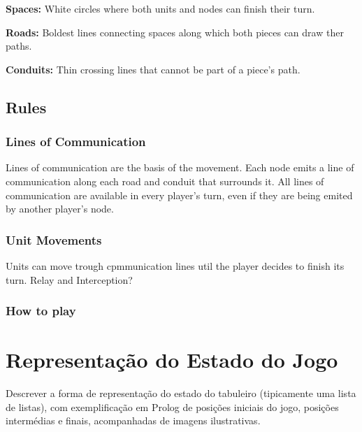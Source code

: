 \documentclass[a4paper]{article}
\begin{document}
\textbf{Spaces: }White circles where both units and nodes can finish their turn.

\textbf{Roads: }Boldest lines connecting spaces along which both pieces can draw ther paths.

\textbf{Conduits: }Thin crossing lines that cannot be part of a piece's path.


\subsection{Rules}

\subsubsection{Lines of Communication}

Lines of communication are the basis of the movement. Each node emits a line of communication along each road and conduit that surrounds it. All lines of communication are available in every player's turn, even if they are being emited by another player's node. 


\subsubsection{Unit Movements}

Units can move trough cpmmunication lines util the player decides to finish its turn.
Relay and Interception?



\subsubsection{How to play}





\section{Representação do Estado do Jogo}

Descrever a forma de representação do estado do tabuleiro (tipicamente uma lista de listas), com exemplificação em Prolog de posições iniciais do jogo, posições intermédias e finais, acompanhadas de imagens ilustrativas.
\end{document}
